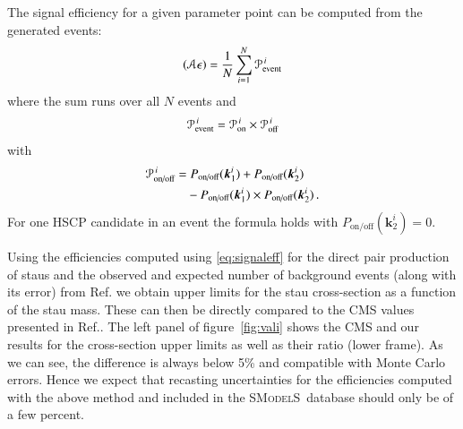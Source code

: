 \documentclass[preprint,number,sort&compress,twocolumn,3p]{elsstyarticle}
\renewcommand{\vec}[1]{\boldsymbol{#1}}
\newcommand{\smo}{\textsc{SModelS}}
\begin{document}
\begin{appendix}
The signal efficiency for a given parameter point can be computed from the generated events:
\begin{equation}
\label{eq:signaleff}
({\cal A}\epsilon) = \frac{1}{N}\sum_{i=1}^N {\cal P}^{\,i}_\text{event} 
\end{equation}
where the sum runs over all $N$ events and
\begin{equation}
\label{eq:pevent}
{\cal P}^{\,i}_\text{event} ={\cal P}^{\,i}_\text{on}\times {\cal P}^{\,i}_\text{off}
\end{equation}
with
\begin{equation}
\begin{split}
{\cal P}^{\,i}_\text{on/off} = &\;P_\text{on/off}(\vec{k}_1^i) + P_\text{on/off}(\vec{k}_2^i)\\
& - P_\text{on/off}(\vec{k}_1^i)\times P_\text{on/off}(\vec{k}_2^i)\,.
\end{split}
\end{equation}
For one HSCP candidate in an event the formula holds with $P_\text{on/off}(\vec{k}_2^i)=0$.


Using the efficiencies computed using \ref{eq:signaleff} for the direct pair production of staus and the observed and expected number of background events (along with its error) from Ref.\cite{Khachatryan:2015lla}
we obtain upper limits for the stau cross-section as a function of the stau mass. These can then be directly compared to the CMS values presented in Ref.\cite{Khachatryan:2015lla}. 
The left panel of figure~\ref{fig:vali} shows the CMS and our results for the cross-section upper limits as well as their ratio (lower frame). As we can see, the difference is always below 5\% and compatible with Monte Carlo errors. Hence we expect that recasting uncertainties for the efficiencies computed with the above method and included in the \smo\ database should
only be of a few percent.




\end{appendix}
\end{document}
